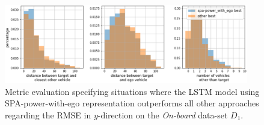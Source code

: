 \begin{figure}[t!]
  \centering
  \includegraphics[width=0.95\textwidth]{imgs/histogram_on_board_revised.eps}
  \caption{Metric evaluation specifying situations where the \ac{LSTM} model using \ac{SPA}-power-with-ego representation outperforms all other approaches regarding the \acs{RMSE} in $y$-direction on the \emph{On-board} data-set $D_1$.}\label{fig:histograms_on_board}
\end{figure}


